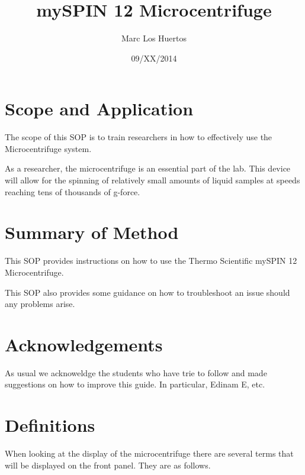 \documentclass[12pt]{../SOP3_beta}
\title{mySPIN 12 Microcentrifuge}
\date{09/XX/2014}
\author{Marc Los Huertos}
\begin{document}


\maketitle

\section{Scope and Application}

\NP The scope of this SOP is to train researchers in how to effectively use the Microcentrifuge system.

\NP As a researcher, the microcentrifuge is an essential part of the lab. This device will allow for the spinning of relatively small amounts of liquid samples at speeds reaching tens of thousands of g-force. 

\section{Summary of Method}

\NP This SOP provides instructions on how to use the Thermo Scientific mySPIN 12 Microcentrifuge. 

\NP This SOP also provides some guidance on how to troubleshoot an issue should any problems arise. 

\tableofcontents

\newpage

\section{Acknowledgements}

\NP As usual we acknoweldge the students who have trie to follow and made suggestions on how to improve this guide. In particular, Edinam E, etc.

\section{Definitions}


\NP When looking at the display of the microcentrifuge there are several terms that will be displayed on the front panel. They are as follows.
\end{document}
